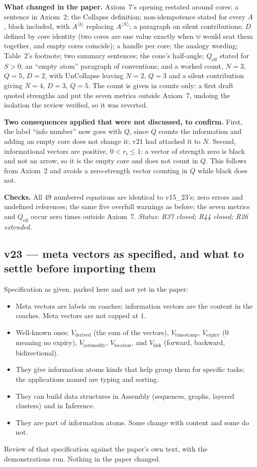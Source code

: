 \documentclass[11pt]{article}
\begin{document}
\textbf{What changed in the paper.} Axiom~7's opening restated around
cores; a sentence in Axiom~2; the Collapse definition; non-idempotence
stated for every $A$, black included, with $A^{\langle k\rangle}$
replacing $A^{\langle N\rangle}$; a paragraph on silent contributions;
$D$ defined by core identity (two cores are one value exactly when
$\uplus$ would seat them together, and empty cores coincide); a handle
per core; the analogy wording; Table~2's footnote; two summary
sentences; the cone's half-angle; $Q_{\mathrm{eff}}$ stated for
$S>0$; an ``empty atom'' paragraph of conventions; and a worked count,
$N=3$, $Q=5$, $D=2$, with UnCollapse leaving $N=2$, $Q=3$ and a silent
contribution giving $N=4$, $D=3$, $Q=5$. The count is given in counts
only: a first draft quoted strengths and put the seven metrics outside
Axiom~7, undoing the isolation the review verified, so it was reverted.

\textbf{Two consequences applied that were not discussed, to confirm.}
First, the label ``info number'' now goes with $Q$, since $Q$ counts the
information and adding an empty core does not change it; v21 had
attached it to $N$. Second, informational vectors are positive,
$0<r_i\le1$: a vector of strength zero is black and not an arrow, so it
is the empty core and does not count in $Q$. This follows from Axiom~2
and avoids a zero-strength vector counting in $Q$ while black does not.

\textbf{Checks.} All 49 numbered equations are identical to v15\_23's;
zero errors and undefined references; the same five overfull warnings as
before; the seven metrics and $Q_{\mathrm{eff}}$ occur zero times outside
Axiom~7.
\emph{Status: R37 closed; R44 closed; R26 extended.}


\subsection*{v23 --- meta vectors as specified, and what to settle before importing them}
Specification as given, parked here and not yet in the paper:
\begin{itemize}
\item Meta vectors are labels on coaches; information vectors are the
content in the coaches. Meta vectors are not capped at $1$.
\item Well-known ones: $V_{\text{derived}}$ (the sum of the vectors),
$V_{\text{timestamp}}$, $V_{\text{expiry}}$ ($0$ meaning no expiry),
$V_{\text{lastmodify}}$, $V_{\text{location}}$, and $V_{\text{link}}$
(forward, backward, bidirectional).
\item They give information atoms kinds that help group them for
specific tasks; the applications named are typing and sorting.
\item They can build data structures in Assembly (sequences, graphs,
layered clusters) and in Inference.
\item They are part of information atoms. Some change with content and
some do not.
\end{itemize}
Review of that specification against the paper's own text, with the
demonstrations run. Nothing in the paper changed.
\end{document}

